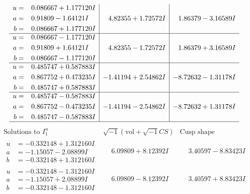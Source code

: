 \documentclass[1p]{elsarticle_modified}
\theoremstyle{definition}
\newcommand{\I}{\sqrt{-1}}
\begin{document}
$$\begin{array}{c|c|c}
\begin{aligned}
u &= \phantom{-}0.086667 + 1.177120 I \\
a &= \phantom{-}0.91809 - 1.64121 I \\
b &= \phantom{-}0.086667 + 1.177120 I\end{aligned}
 & \phantom{-}4.82355 + 1.72572 I & \phantom{-}1.86379 - 3.16589 I \\ \hline\begin{aligned}
u &= \phantom{-}0.086667 - 1.177120 I \\
a &= \phantom{-}0.91809 + 1.64121 I \\
b &= \phantom{-}0.086667 - 1.177120 I\end{aligned}
 & \phantom{-}4.82355 - 1.72572 I & \phantom{-}1.86379 + 3.16589 I \\ \hline\begin{aligned}
u &= \phantom{-}0.485747 + 0.587883 I \\
a &= \phantom{-}0.867752 + 0.473235 I \\
b &= \phantom{-}0.485747 + 0.587883 I\end{aligned}
 & -1.41194 + 2.54862 I & -8.72632 - 1.31178 I \\ \hline\begin{aligned}
u &= \phantom{-}0.485747 - 0.587883 I \\
a &= \phantom{-}0.867752 - 0.473235 I \\
b &= \phantom{-}0.485747 - 0.587883 I\end{aligned}
 & -1.41194 - 2.54862 I & -8.72632 + 1.31178 I\\
 \hline 
 \end{array}$$\newpage$$\begin{array}{c|c|c}  
\text{Solutions to }I^u_{1}& \I (\text{vol} + \sqrt{-1}CS) & \text{Cusp shape}\\
 \hline 
\begin{aligned}
u &= -0.332148 + 1.312160 I \\
a &= -1.15057 - 2.08899 I \\
b &= -0.332148 + 1.312160 I\end{aligned}
 & \phantom{-}6.09809 + 8.12392 I & \phantom{-}3.40597 - 8.83423 I \\ \hline\begin{aligned}
u &= -0.332148 - 1.312160 I \\
a &= -1.15057 + 2.08899 I \\
b &= -0.332148 - 1.312160 I\end{aligned}
 & \phantom{-}6.09809 - 8.12392 I & \phantom{-}3.40597 + 8.83423 I \\ \hline\begin{aligned}

\end{aligned}
\end{array}$$
\end{document}
